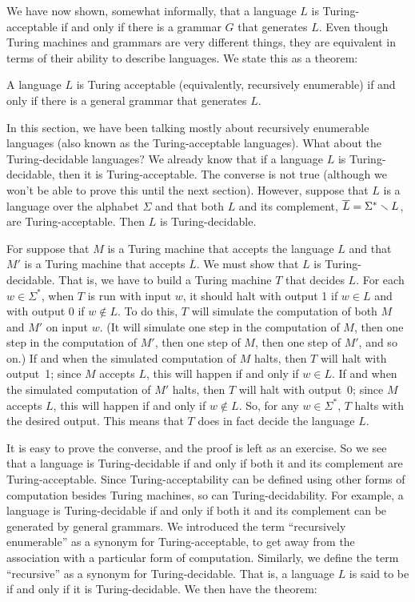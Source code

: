 We have now shown, somewhat informally, that a language
$L$ is Turing-acceptable if and only if there is a grammar $G$
that generates $L$.  Even though Turing machines and grammars
are very different things, they are equivalent in terms of
their ability to describe languages.  We state this as a theorem:
\begin{theorem}
A language $L$ is Turing acceptable (equivalently, recursively enumerable)
if and only if there is a general grammar that generates $L$.
\end{theorem}

\bigskip

In this section, we have been talking mostly about recursively enumerable
languages (also known as the Turing-acceptable languages).  What
about the Turing-decidable languages?  
We already know that if a language $L$ is Turing-decidable,
then it is Turing-acceptable.  The converse is not true (although
we won't be able to prove this until the next section).  However, suppose
that $L$ is a language over the alphabet $\Sigma$ and that both
$L$ and its complement,  $\overline{L}=\Sigma^*\smallsetminus L$, are Turing-acceptable.
Then $L$ is Turing-decidable.

For suppose that $M$ is a Turing machine that accepts the language
$L$ and that $M'$ is a Turing machine that accepts $\overline{L}$.
We must show that $L$ is Turing-decidable.  That is,
we have to build a Turing machine $T$ that decides $L$. For each
$w\in\Sigma^*$, when $T$ is run with input $w$, it should halt with
output 1 if $w\in L$ and with output $0$ if $w\not\in L$.  To do this,
$T$ will simulate the computation of both $M$ and $M'$ on input $w$.
(It will simulate one step in the computation of $M$, then one step
in the computation of $M'$, then one step of $M$, then one step of $M'$,
and so on.)  If and when the simulated computation of $M$ halts, then
$T$ will halt with output~1; since $M$ accepts $L$, this will happen if and
only if $w\in L$.  If and when the simulated computation of $M'$ halts, then
$T$ will halt with output~0; since $M$ accepts $L$, this will happen if and
only if $w\not\in L$.  So, for any $w\in\Sigma^*$, $T$ halts with the
desired output.  This means that $T$ does in fact decide the language $L$.

It is easy to prove the converse, and the proof is left as an exercise. So
we see that a language is Turing-decidable if and only if both it and
its complement are Turing-acceptable.  Since Turing-acceptability can
be defined using other forms of computation besides Turing machines,
so can Turing-decidability.  For example, a language is Turing-decidable
if and only if both it and its complement can be generated by general grammars.
We introduced the term ``recursively enumerable''
as a synonym for Turing-acceptable, to get away from the association with a
particular form of computation.  Similarly, we define the term ``recursive''
as a synonym for Turing-decidable.  That is, a language $L$
is said to be  if and only if it
is Turing-decidable.  We then have the theorem:

